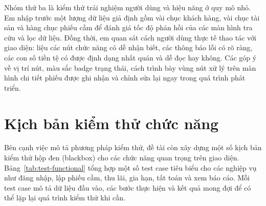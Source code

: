 \documentclass[13pt,a4paper]{extreport}
\begin{document}
Nhóm thứ ba là kiểm thử trải nghiệm người dùng và hiệu năng ở quy mô nhỏ. Em nhập trước một lượng dữ liệu giả định gồm vài chục khách hàng, vài chục tài sản và hàng chục phiếu cầm để đánh giá tốc độ phản hồi của các màn hình tra cứu và lọc dữ liệu. Đồng thời, em quan sát cách người dùng thực tế thao tác với giao diện: liệu các nút chức năng có dễ nhận biết, các thông báo lỗi có rõ ràng, các con số tiền tệ có được định dạng nhất quán và dễ đọc hay không. Các góp ý về vị trí nút, màu sắc badge trạng thái, cách trình bày vùng nút xử lý trên màn hình chi tiết phiếu được ghi nhận và chỉnh sửa lại ngay trong quá trình phát triển.

\section{Kịch bản kiểm thử chức năng}

Bên cạnh việc mô tả phương pháp kiểm thử, đề tài còn xây dựng một số kịch bản kiểm thử hộp đen (blackbox) cho các chức năng quan trọng trên giao diện. Bảng~\ref{tab:test-functional} tổng hợp một số test case tiêu biểu cho các nghiệp vụ như đăng nhập, lập phiếu cầm, thu lãi, gia hạn, tất toán và xem báo cáo. Mỗi test case mô tả dữ liệu đầu vào, các bước thực hiện và kết quả mong đợi để có thể lặp lại quá trình kiểm thử khi cần.
\end{document}
